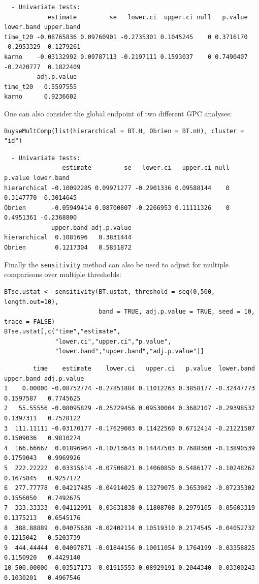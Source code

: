 \documentclass[12pt]{article}
\begin{document}
\begin{verbatim}
  - Univariate tests:
            estimate         se   lower.ci  upper.ci null   p.value lower.band upper.band
time_t20 -0.08765836 0.09760901 -0.2735301 0.1045245    0 0.3716170 -0.2953329  0.1279261
karno    -0.03132992 0.09787113 -0.2197111 0.1593037    0 0.7490407 -0.2420777  0.1822409
         adj.p.value
time_t20   0.5597555
karno      0.9236602
\end{verbatim}


One can also consider the global endpoint of two different GPC analyses:
\lstset{language=r,label= ,caption= ,captionpos=b,numbers=none}
\begin{lstlisting}
BuyseMultComp(list(hierarchical = BT.H, Obrien = BT.nH), cluster = "id")
\end{lstlisting}

\begin{verbatim}
  - Univariate tests:
                estimate         se   lower.ci   upper.ci null   p.value lower.band
hierarchical -0.10092285 0.09971277 -0.2901336 0.09588144    0 0.3147770 -0.3014645
Obrien       -0.05949414 0.08700807 -0.2266953 0.11111326    0 0.4951361 -0.2368800
             upper.band adj.p.value
hierarchical  0.1081696   0.3831444
Obrien        0.1217304   0.5851872
\end{verbatim}


Finally the \texttt{sensitivity} method can also be used to adjust for
multiple comparisons over multiple thresholds:
\lstset{language=r,label= ,caption= ,captionpos=b,numbers=none}
\begin{lstlisting}
BTse.ustat <- sensitivity(BT.ustat, threshold = seq(0,500, length.out=10),
                          band = TRUE, adj.p.value = TRUE, seed = 10, trace = FALSE)
BTse.ustat[,c("time","estimate",
              "lower.ci","upper.ci","p.value",
              "lower.band","upper.band","adj.p.value")]
\end{lstlisting}

\begin{verbatim}
        time    estimate    lower.ci   upper.ci   p.value  lower.band upper.band adj.p.value
1    0.00000 -0.08752774 -0.27851884 0.11012263 0.3858177 -0.32447773  0.1597587   0.7745625
2   55.55556 -0.08095829 -0.25229456 0.09530004 0.3682107 -0.29398532  0.1397311   0.7528122
3  111.11111 -0.03170177 -0.17629003 0.11422560 0.6712414 -0.21221507  0.1509036   0.9810274
4  166.66667  0.01896964 -0.10713643 0.14447503 0.7688360 -0.13890539  0.1759043   0.9969926
5  222.22222  0.03315614 -0.07506821 0.14060850 0.5486177 -0.10248262  0.1675845   0.9257172
6  277.77778  0.04217485 -0.04914025 0.13279075 0.3653982 -0.07235302  0.1556050   0.7492675
7  333.33333  0.04112991 -0.03631838 0.11808708 0.2979105 -0.05603319  0.1375213   0.6545176
8  388.88889  0.04075638 -0.02402114 0.10519310 0.2174545 -0.04052732  0.1215042   0.5203739
9  444.44444  0.04097871 -0.01844156 0.10011054 0.1764199 -0.03358825  0.1150920   0.4429140
10 500.00000  0.03517173 -0.01915553 0.08929191 0.2044340 -0.03300243  0.1030201   0.4967546
\end{verbatim}
\end{document}
